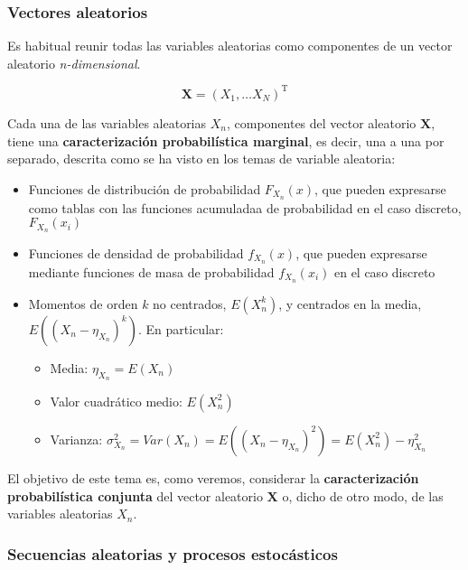\documentclass[11pt]{article}
\providecommand{\tightlist}{%
      \setlength{\itemsep}{0pt}\setlength{\parskip}{0pt}}
\begin{document}
    \hypertarget{vectores-aleatorios}{%
\subsubsection{Vectores aleatorios}\label{vectores-aleatorios}}

Es habitual reunir todas las variables aleatorias como componentes de un
vector aleatorio \emph{n-dimensional}.

\[\mathbf X = (X_1, \ldots X_N)^\mathrm{T}\]

Cada una de las variables aleatorias \(X_n\), componentes del vector
aleatorio \(\mathbf X\), tiene una \textbf{caracterización
probabilística marginal}, es decir, una a una por separado, descrita
como se ha visto en los temas de variable aleatoria:

\begin{itemize}
\tightlist
\item
  Funciones de distribución de probabilidad \(F_{X_n}(x)\), que pueden
  expresarse como tablas con las funciones acumuladaa de probabilidad en
  el caso discreto, \(F_{X_n}(x_i)\)
\item
  Funciones de densidad de probabilidad \(f_{X_n}(x)\), que pueden
  expresarse mediante funciones de masa de probabilidad \(f_{X_n}(x_i)\)
  en el caso discreto
\item
  Momentos de orden \(k\) no centrados, \(E(X_n^k)\), y centrados en la
  media, \(E((X_n-\eta_{X_n})^k)\). En particular:

  \begin{itemize}
  \tightlist
  \item
    Media: \(\eta_{X_n}=E(X_n)\)
  \item
    Valor cuadrático medio: \(E(X_n^2)\)
  \item
    Varianza:
    \(\sigma_{X_n}^2=Var(X_n)=E((X_n-\eta_{X_n})^2)= E(X_n^2) - \eta_{X_n}^2\)
  \end{itemize}
\end{itemize}

El objetivo de este tema es, como veremos, considerar la
\textbf{caracterización probabilística conjunta} del vector aleatorio
\(\mathbf X\) o, dicho de otro modo, de las variables aleatorias
\(X_n\).

    \hypertarget{secuencias-aleatorias-y-procesos-estocuxe1sticos}{%
\subsubsection{Secuencias aleatorias y procesos
estocásticos}\label{secuencias-aleatorias-y-procesos-estocuxe1sticos}}
\end{document}
